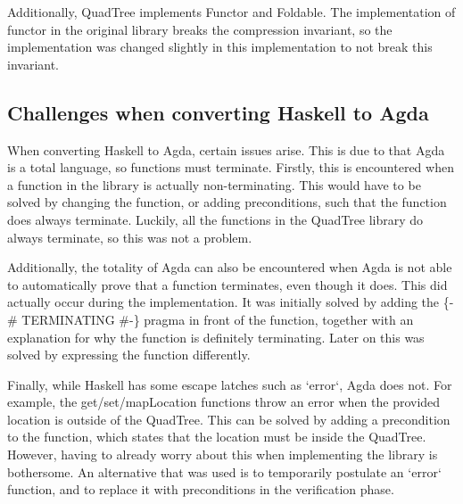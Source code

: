 Additionally, QuadTree implements Functor and Foldable. The implementation of functor in the original library breaks the compression invariant, so the implementation was changed slightly in this implementation to not break this invariant.

\subsection{Challenges when converting Haskell to Agda}
When converting Haskell to Agda, certain issues arise. This is due to that Agda is a total language, so functions must terminate. Firstly, this is encountered when a function in the library is actually non-terminating. This would have to be solved by changing the function, or adding preconditions, such that the function does always terminate. Luckily, all the functions in the QuadTree library do always terminate, so this was not a problem.

Additionally, the totality of Agda can also be encountered when Agda is not able to automatically prove that a function terminates, even though it does. This did actually occur during the implementation. It was initially solved by adding the \{-\# TERMINATING \#-\} pragma in front of the function, together with an explanation for why the function is definitely terminating. Later on this was solved by expressing the function differently.

Finally, while Haskell has some escape latches such as `error`, Agda does not. For example, the get/set/mapLocation functions throw an error when the provided location is outside of the QuadTree. This can be solved by adding a precondition to the function, which states that the location must be inside the QuadTree. However, having to already worry about this when implementing the library is bothersome. An alternative that was used is to temporarily postulate an `error` function, and to replace it with preconditions in the verification phase.

